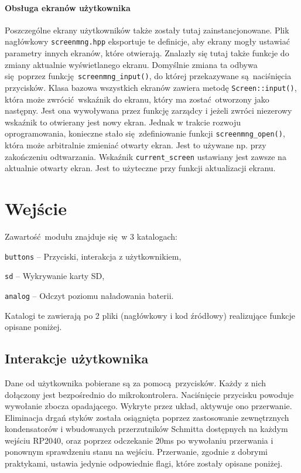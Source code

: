 \documentclass[polish]{aghengthesis}
\let\tempone\itemize
\let\temptwo\enditemize
\renewenvironment{itemize}{\tempone\setlength{\itemsep}{0cm}}{\temptwo}
\begin{document}
			\paragraph{Obsługa ekranów użytkownika}
				Poszczególne ekrany użytkowników także zostały tutaj zainstancjonowane. Plik nagłówkowy \lstinline|screenmng.hpp| eksportuje te definicje, aby ekrany mogły ustawiać parametry innych ekranów, które otwierają. Znalazły się tutaj także funkcje do zmiany aktualnie wyświetlanego ekranu. Domyślnie zmiana ta odbywa się poprzez funkcję \lstinline|screenmng_input()|, do której przekazywane są naciśnięcia przycisków. Klasa bazowa wszystkich ekranów zawiera metodę \lstinline|Screen::input()|, która może zwrócić wskaźnik do ekranu, który ma zostać otworzony jako następny. Jest ona wywoływana przez funkcję zarządcy i jeżeli zwróci niezerowy wskaźnik to otwierany jest nowy ekran. Jednak w trakcie rozwoju oprogramowania, konieczne stało się zdefiniowanie funkcji \lstinline|screenmng_open()|, która może arbitralnie zmieniać otwarty ekran. Jest to używane np. przy zakończeniu odtwarzania. Wskaźnik \lstinline|current_screen| ustawiany jest zawsze na aktualnie otwarty ekran. Jest to użyteczne przy funkcji aktualizacji ekranu.

	\section{Wejście}
		\noindent
		Zawartość modułu znajduje się w 3 katalogach:
		\begin{itemize}
			\item \lstinline|buttons| -- Przyciski, interakcja z użytkownikiem,
			\item \lstinline|sd| -- Wykrywanie karty SD,
			\item \lstinline|analog| -- Odczyt poziomu naładowania baterii.
		\end{itemize}
		
		Katalogi te zawierają po 2 pliki (nagłówkowy i kod źródłowy) realizujące funkcje opisane poniżej.
		
		\subsection{Interakcje użytkownika}
			Dane od użytkownika pobierane są za pomocą przycisków. Każdy z nich dołączony jest bezpośrednio do mikrokontrolera. Naciśnięcie przycisku powoduje wywołanie zbocza opadającego. Wykryte przez układ, aktywuje ono przerwanie. Eliminacja drgań styków została osiągnięta poprzez zastosowanie zewnętrznych kondensatorów i wbudowanych przerzutników Schmitta dostępnych na każdym wejściu RP2040, oraz poprzez odczekanie 20ms po wywołaniu przerwania i ponownym sprawdzeniu stanu na wejściu. Przerwanie, zgodnie z dobrymi praktykami, ustawia jedynie odpowiednie flagi, które zostały opisane poniżej.
			
\end{document}
